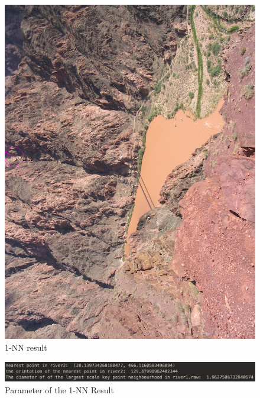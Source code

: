 \documentclass[11pt]{article}
\begin{document}
\begin{figure}[!htp]
	\centering
	\includegraphics[scale=0.2]{1nn_river2.png}
	\caption{ 1-NN result}
	\label{1nn_river2}
	\end{figure}
	
	\begin{figure}[!htp]
		\centering
		\includegraphics[scale=0.3]{1nnpara.png}
		\caption{ Parameter of the 1-NN Result}
		\label{1nnpara}
		\end{figure}
\end{document}
